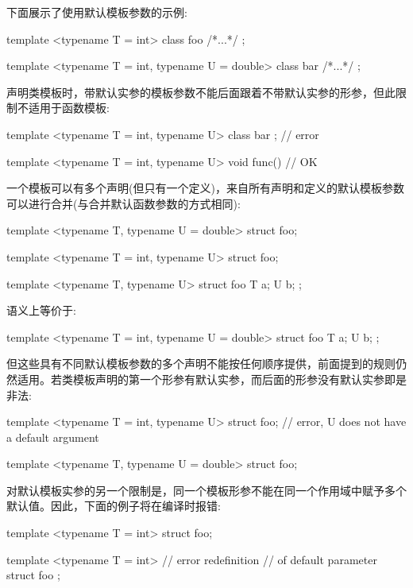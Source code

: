 下面展示了使用默认模板参数的示例:

\begin{cpp}
template <typename T = int>
class foo { /*...*/ };

template <typename T = int, typename U = double>
class bar { /*...*/ };
\end{cpp}

声明类模板时，带默认实参的模板参数不能后面跟着不带默认实参的形参，但此限制不适用于函数模板:

\begin{cpp}
template <typename T = int, typename U>
class bar { }; // error

template <typename T = int, typename U>
void func() {} // OK
\end{cpp}

一个模板可以有多个声明(但只有一个定义)，来自所有声明和定义的默认模板参数可以进行合并(与合并默认函数参数的方式相同):

\begin{cpp}
template <typename T, typename U = double>
struct foo;

template <typename T = int, typename U>
struct foo;

template <typename T, typename U>
struct foo
{
	T a;
	U b;
};
\end{cpp}

语义上等价于:

\begin{cpp}
template <typename T = int, typename U = double>
struct foo
{
	T a;
	U b;
};
\end{cpp}

但这些具有不同默认模板参数的多个声明不能按任何顺序提供，前面提到的规则仍然适用。若类模板声明的第一个形参有默认实参，而后面的形参没有默认实参即是非法:

\begin{cpp}
template <typename T = int, typename U>
struct foo; // error, U does not have a default argument

template <typename T, typename U = double>
struct foo;
\end{cpp}

对默认模板实参的另一个限制是，同一个模板形参不能在同一个作用域中赋予多个默认值。因此，下面的例子将在编译时报错:

\begin{cpp}
template <typename T = int>
struct foo;

template <typename T = int> // error redefinition
                            // of default parameter
struct foo {};
\end{cpp}

